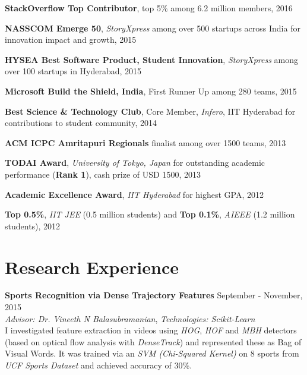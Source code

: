 \documentclass[margin,line]{res}
\begin{document}
\begin{resume}
  {\bf StackOverflow Top Contributor}, top 5\% among 6.2 million members, 2016

  \vspace*{-2.5mm}

  {\bf NASSCOM Emerge 50}, {\it StoryXpress} among over 500 startups across India for innovation impact and growth, 2015

  \vspace*{-2.5mm}

  {\bf HYSEA Best Software Product, Student Innovation}, {\it StoryXpress} among over 100 startups in Hyderabad, 2015

  \vspace*{-2.5mm}

  {\bf Microsoft Build the Shield, India}, First Runner Up among 280 teams, 2015

  \vspace*{-2.5mm}

  {\bf Best Science \& Technology Club}, Core Member, {\it Infero}, IIT Hyderabad for contributions to student community, 2014

  \vspace*{-2.5mm}

  {\bf ACM ICPC Amritapuri Regionals} finalist among over 1500 teams, 2013

  \vspace*{-2.5mm}

  {\bf TODAI Award}, {\it University of Tokyo, Japan} for outstanding academic performance ({\bf Rank 1}), cash prize of USD 1500, 2013

  \vspace*{-2.5mm}

  {\bf Academic Excellence Award}, {\it IIT Hyderabad} for highest GPA, 2012

  \vspace*{-2.5mm}

  {\bf Top 0.5\%}, {\it IIT JEE} (0.5 million students) and {\bf Top 0.1\%}, {\it AIEEE} (1.2 million students), 2012

\section{\sc Research Experience}

  {\bf Sports Recognition via Dense Trajectory Features} \hfill September - November, 2015 \\
  	{\em Advisor: Dr. Vineeth N Balasubramanian}, {\em Technologies: Scikit-Learn} \\
    I investigated feature extraction in videos using {\it HOG}, {\it HOF} and {\it MBH} detectors (based on optical flow analysis with {\it DenseTrack}) and represented these as Bag of Visual Words. It was trained via an {\it SVM (Chi-Squared Kernel)} on 8 sports from {\it UCF Sports Dataset} and achieved accuracy of 30\%.


\end{resume}
\end{document}
